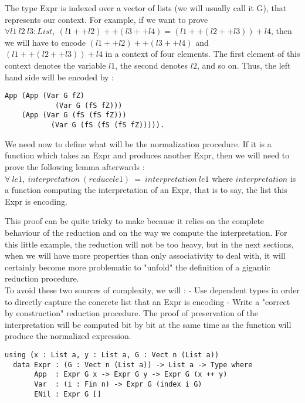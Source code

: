 \documentclass{sigplanconf}
\begin{document}
The type Expr is indexed over a vector of lists (we will usually call it G), that represents our context. For example, if we want to prove $\forall l1\ l2\ l3 : List,\ (l1 ++ l2) ++ (l3 ++ l4) = (l1 ++ (l2 ++ l3)) + l4$, then we will have to encode $(l1 ++ l2) ++ (l3 ++ l4)$ and $(l1 ++ (l2 ++ l3)) + l4$ in a context of four elements. The first element of this context denotes the variable $l1$, the second denotes $l2$, and so on.
Thus, the left hand side will be encoded by :
\begin{lstlisting}[caption=Reflected LHS, captionpos=b, label=lst1:haskell2]
App (App (Var G fZ) 
			(Var G (fS fZ))) 
    (App (Var G (fS (fS fZ))) 
    	   (Var G (fS (fS (fS fZ))))).
\end{lstlisting}

We need now to define what will be the normalization procedure.
If it is a function which takes an Expr and produces another Expr, then we will need to prove the following lemma afterwards :
$\forall\ le1,\ interpretation\ (reduce le1)\ =\ interpretation\ le1$
where $interpretation$ is a function computing the interpretation of an Expr, that is to say, the list this Expr is encoding.

This proof can be quite tricky to make because it relies on the complete behaviour of the reduction and on the way we compute the interpretation.
For this little example, the reduction will not be too heavy, but in the next sections, when we will have more properties than only associativity to deal with, it will certainly become more problematic to "unfold" the definition of a gigantic reduction procedure. \\
To avoid these two sources of complexity, we will :
- Use dependent types in order to directly capture the concrete list that an Expr is encoding
- Write a "correct by construction" reduction procedure. The proof of preservation of the interpretation will be computed bit by bit at the same time as the function will produce the normalized expression.

\begin{lstlisting}[caption=New reflected lists, captionpos=b, label=lst1:haskell2]
using (x : List a, y : List a, G : Vect n (List a))
  data Expr : (G : Vect n (List a)) -> List a -> Type where
       App  : Expr G x -> Expr G y -> Expr G (x ++ y)
       Var  : (i : Fin n) -> Expr G (index i G)
       ENil : Expr G []
\end{lstlisting}
\end{document}
